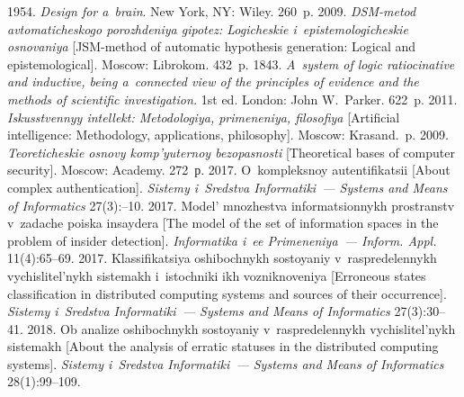 \begin{multicols}{2}
{{\begin{thebibliography}{9}
 1954. \textit{Design for a~brain}. New York, NY: Wiley. 260~p.
2009. \textit{DSM-metod avtomaticheskogo porozhdeniya gipotez: 
Logicheskie i~epistemologicheskie osnovaniya} [JSM-method of automatic hypothesis generation: 
Logical and epistemological]. Moscow: Librokom. 432~p.
 1843. \textit{A~system of logic ratiocinative and inductive, being a~connected 
view of the principles of evidence and the methods of scientific investigation.} 1st ed. London: John 
W.~Parker. 622~p.
 2011. \textit{Iskusstvennyy intellekt: Metodologiya, primeneniya, 
filosofiya} 
[Artificial intelligence: Methodology, applications, philosophy]. Moscow: Krasand.~p.
 2009. \textit{Teoreticheskie osnovy 
komp'yuternoy bezopasnosti} [Theoretical 
bases of computer security]. Moscow: 
Academy. 272~р.
2017. O~kom\-pleks\-noy autenti\-fi\-ka\-tsii [About complex authentication]. \textit{Sistemy i~Sredstva 
Informatiki~--- Systems and Means of Informatics} 27(3):--10.
 2017. Model' 
mnozhestva informatsionnykh prostranstv v~zadache poiska insaydera [The model of the set of 
information spaces in the problem of insider detection]. \textit{Informatika i~ee Primeneniya~--- 
Inform. Appl.} 11(4):65--69.
 2017. Klassifikatsiya oshibochnykh sostoyaniy v~raspredelennykh 
vychislitel'nykh sistemakh i~istochniki ikh vozniknoveniya [Erroneous states classification in 
distributed computing systems and sources of their occurrence]. \textit{Sistemy i~Sredstva 
Informatiki~--- Systems and Means of Informatics} 27(3):30--41.
 2018. Ob analize oshibochnykh 
sostoyaniy v~raspredelennykh vychislitel'nykh sistemakh [About the analysis of erratic statuses in 
the distributed computing systems]. \textit{Sistemy i~Sredstva Informatiki~--- Systems and Means 
of Informatics} 28(1):99--109.
\end{thebibliography}

 }
 }

\end{multicols}

